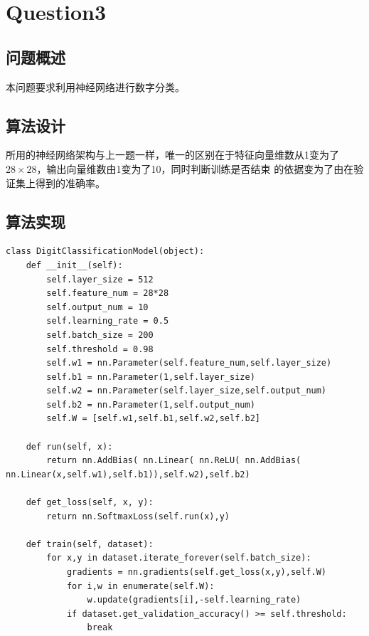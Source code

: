 \chapter{Question3}
\section{问题概述}
%
%
本问题要求利用神经网络进行数字分类。

%
%

%
%

\section{算法设计}
%
%
所用的神经网络架构与上一题一样，唯一的区别在于特征向量维数从1变为了$28\times28$，输出向量维数由1变为了10，同时判断训练是否结束
的依据变为了由在验证集上得到的准确率。
\section{算法实现}
%
%
%
\begin{lstlisting}[emph={[3]dataset,x,y},emphstyle={[3]\color{vscode_parametercolor}},emph={[4]DigitClassificationModel,RegressionModel,GameState,MinimaxAgent,AlphaBetaAgent},emphstyle={[4]\color{vscode_classcolor}}]
class DigitClassificationModel(object):
    def __init__(self):
        self.layer_size = 512
        self.feature_num = 28*28
        self.output_num = 10
        self.learning_rate = 0.5
        self.batch_size = 200
        self.threshold = 0.98
        self.w1 = nn.Parameter(self.feature_num,self.layer_size)
        self.b1 = nn.Parameter(1,self.layer_size)
        self.w2 = nn.Parameter(self.layer_size,self.output_num)
        self.b2 = nn.Parameter(1,self.output_num)
        self.W = [self.w1,self.b1,self.w2,self.b2]

    def run(self, x):
        return nn.AddBias( nn.Linear( nn.ReLU( nn.AddBias( nn.Linear(x,self.w1),self.b1)),self.w2),self.b2)

    def get_loss(self, x, y):
        return nn.SoftmaxLoss(self.run(x),y)

    def train(self, dataset):
        for x,y in dataset.iterate_forever(self.batch_size):
            gradients = nn.gradients(self.get_loss(x,y),self.W)
            for i,w in enumerate(self.W):
                w.update(gradients[i],-self.learning_rate)
            if dataset.get_validation_accuracy() >= self.threshold:
                break
\end{lstlisting}
